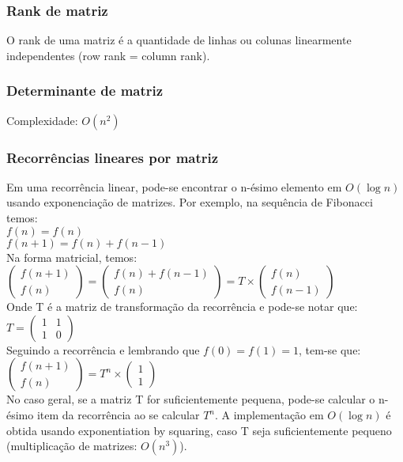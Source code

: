 \divisor

\subsubsection{Rank de matriz}
O rank de uma matriz \'{e} a quantidade de linhas ou colunas linearmente independentes (row rank = column  rank).

\divisor

\subsubsection{Determinante de matriz}
Complexidade: $O(n^2)$
\divisor

\subsubsection{Recorrências lineares por matriz}
Em uma recorrência linear, pode-se encontrar o n-ésimo elemento em $O(\log{n})$ usando exponenciação de matrizes. Por exemplo, na sequência de Fibonacci temos:
\\ $f(n) = f(n)$
\\ $f(n+1) = f(n)+f(n-1)$
\\Na forma matricial, temos:
\\
$\left( \begin{array}{c}
f(n+1) \\
f(n) \end{array} \right)
 = 
\left( \begin{array}{c}
f(n) + f(n-1) \\
f(n) \end{array} \right)
 = T \times
\left( \begin{array}{c}
f(n) \\
f(n-1) \end{array} \right)$
\\ Onde T é a matriz de transformação da recorrência e pode-se notar que:
$T=\left( \begin{array}{cc}
1 & 1 \\
1 & 0 \end{array} \right)$
\\ Seguindo a recorrência e lembrando que $f(0) = f(1) = 1$, tem-se que:
\\$\left( \begin{array}{c}
f(n+1) \\
f(n) \end{array} \right) = T^n \times
\left( \begin{array}{c}
1 \\
1 \end{array} \right)$
\\ No caso geral, se a matriz T for suficientemente pequena, pode-se calcular o n-ésimo item da recorrência ao se calcular $T^n$. A implementação em $O(\log{n})$ é obtida usando exponentiation by squaring, caso T seja suficientemente pequeno (multiplica\c{c}\~{a}o de matrizes: $O(n^3)$).

